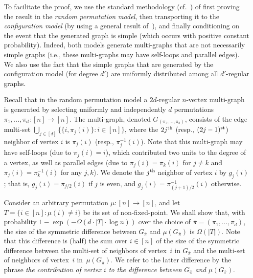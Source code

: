 \documentclass[10pt,a4paper]{article}
\theoremstyle{definition}
\newcommand{\xth}{{\rm th}}
\newcommand{\st}{{\rm st}}
\newcommand{\ov}{\overline}
\begin{document}
To facilitate the proof,
we use the standard methodology (cf.~\cite[Apdx.~2]{E})
of first proving the result in the {\em random permutation model},
%
then transporting it to the {\em configuration model}\/
%
(by using a general result of~\cite{GJKW}),
and finally conditioning on the event that the generated graph
is simple (which occurs with positive constant probability).
Indeed, both models generate multi-graphs
that are not necessarily simple graphs
(i.e., these multi-graphs may have self-loops and parallel edges).
We also use the fact that the simple graphs that are
generated by the configuration model (for degree $d'$)
are uniformly distributed among all $d'$-regular graphs.

Recall that in the {\sf random permutation model}
a $2d$-regular $n$-vertex multi-graph is generated by selecting
uniformly and independently $d$ permutations $\pi_1,\ldots,\pi_d:[n]\to[n]$.
The multi-graph, denoted $G_{(\pi_1,\ldots,\pi_d)}$,
consists of the edge multi-set
$\bigcup_{j\in[d]}\{\{i,\pi_j(i)\}:i\in[n]\}$,
where the $2j^\xth$ (resp., $(2j-1)^\st$) neighbor of vertex $i$
is $\pi_j(i)$ (resp., $\pi_j^{-1}(i)$).
Note that this multi-graph may have self-loops (due to $\pi_j(i)=i$),
which contributed two units to the degree of a vertex,
as well as parallel edges
(due to $\pi_j(i)=\pi_k(i)$ for $j\neq k$
and $\pi_j(i)=\pi_k^{-1}(i)$ for any $j,k$).
We denote the $j^\xth$ neighbor of vertex $i$ by $g_j(i)$;
that is, $g_j(i)=\pi_{j/2}(i)$ if $j$ is even,
and $g_j(i)=\pi_{(j+1)/2}^{-1}(i)$ otherwise.
%

Consider an arbitrary permutation $\mu:[n]\to[n]$,
and let $T=\{i\!\in\![n]\!:\!\mu(i)\neq i\}$
be its set of non-fixed-point.
We shall show that,
with probability $1-\exp(-\Omega(d\cdot|T|\cdot\log n))$
over the choice of ${\ov\pi}=(\pi_1,\ldots,\pi_d)$,
the size of the symmetric difference
between $G_{\ov\pi}$ and $\mu(G_{\ov\pi})$ is $\Omega(|T|)$.
Note that this difference is (half) the sum over $i\in[n]$
of the size of the symmetric difference between the multi-set
of neighbors of vertex~$i$ in $G_{\ov\pi}$
and the multi-set of neighbors of vertex~$i$ in~$\mu(G_{\ov\pi})$.
We refer to the latter difference by the phrase
{\em the contribution of vertex $i$ to the difference
between $G_{\ov\pi}$ and $\mu(G_{\ov\pi})$}.
\end{document}
